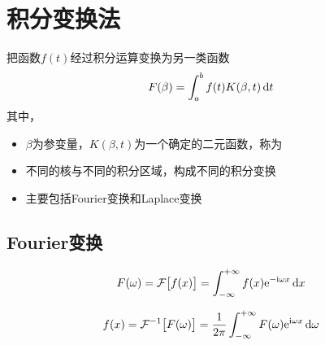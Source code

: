 \chapter{积分变换法}
\thispagestyle{empty}

\tdefination[积分变换]
把函数$f(t)$经过积分运算变换为另一类函数
\begin{align}
	F(\beta) = \int_a^b f(t)K(\beta, t) \, {\rm{d}} t
\end{align}
其中，
\begin{itemize}
	\item $\beta$为参变量，$K(\beta, t)$为一个确定的二元函数，称为\vspace*{-0.5em}
	\item 不同的核与不同的积分区域，构成不同的积分变换\vspace*{-0.5em}
	\item 主要包括Fourier变换和Laplace变换
\end{itemize}

\section{Fourier变换}
\vspace{0.5em}
\ttheorem[Fourier变换]
\begin{align}
	F(\omega) = \mathcal{F}\big[f(x)\big] = \int_{- \infty}^{+ \infty} f(x) {\rm{e}}^{- {\rm{i}} \omega x}\, {\rm{d}} x
\end{align}
\vspace*{-2em}

\begin{align}
	f(x) = \mathcal{F}^{-1} \big[F(\omega)\big] = \dfrac{1}{2 \pi} \int_{- \infty}^{+ \infty} F(\omega) {\rm{e}}^{{\rm{i}} \omega x}\, {\rm{d}} \omega
\end{align}

\warn[
Fourier变换的重要条件：\textbf{分段光滑}\footnote{\textbf{分段光滑}：一阶导数存在，且导函数只有第一类间断点。}、\textbf{绝对可积}$\displaystyle \int_{- \infty }^{+ \infty} \big|f(x)\big|\, \d x < + \infty$\vspace*{-0.5em}
{
\begin{enumerate}[\hspace*{2em} \textbf{推论} 1 \hspace*{2em}]
	\item $\displaystyle \int_{- \infty}^{+ \infty} f(x)\, \d x = \mbox{有限值}$
	\item $x \to \pm \infty, f(x) \to 0$
\end{enumerate}
}
]

